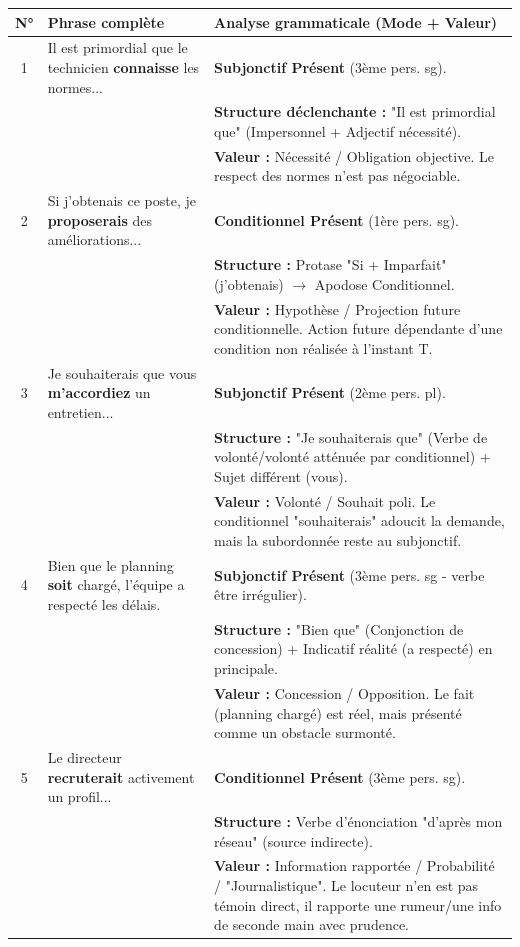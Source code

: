 \documentclass[11pt]{article}
\newcommand{\cle}[1]{{\popxbold\color{popdark}#1}}
\begin{document}
\begin{exoresolu}
\begin{center}
\begin{tabularx}{\linewidth}{|c|l|X|}
\hline
\textbf{N°} & \textbf{Phrase complète} & \textbf{Analyse grammaticale (Mode + Valeur)} \\ \hline
1 & Il est primordial que le technicien \textbf{connaisse} les normes... & \textbf{Subjonctif Présent} (3ème pers. sg). \\
  & & \textbf{Structure déclenchante :} "Il est primordial que" (Impersonnel + Adjectif nécessité). \\
  & & \textbf{Valeur :} \cle{Nécessité / Obligation objective}. Le respect des normes n'est pas négociable. \\ \hline
2 & Si j'obtenais ce poste, je \textbf{proposerais} des améliorations... & \textbf{Conditionnel Présent} (1ère pers. sg). \\
  & & \textbf{Structure :} Protase "Si + Imparfait" (j'obtenais) $\rightarrow$ Apodose Conditionnel. \\
  & & \textbf{Valeur :} \cle{Hypothèse / Projection future conditionnelle}. Action future dépendante d'une condition non réalisée à l'instant T. \\ \hline
3 & Je souhaiterais que vous \textbf{m'accordiez} un entretien... & \textbf{Subjonctif Présent} (2ème pers. pl). \\
  & & \textbf{Structure :} "Je souhaiterais que" (Verbe de volonté/volonté atténuée par conditionnel) + Sujet différent (vous). \\
  & & \textbf{Valeur :} \cle{Volonté / Souhait poli}. Le conditionnel "souhaiterais" adoucit la demande, mais la subordonnée reste au subjonctif. \\ \hline
4 & Bien que le planning \textbf{soit} chargé, l'équipe a respecté les délais. & \textbf{Subjonctif Présent} (3ème pers. sg - verbe être irrégulier). \\
  & & \textbf{Structure :} "Bien que" (Conjonction de concession) + Indicatif réalité (a respecté) en principale. \\
  & & \textbf{Valeur :} \cle{Concession / Opposition}. Le fait (planning chargé) est réel, mais présenté comme un obstacle surmonté. \\ \hline
5 & Le directeur \textbf{recruterait} activement un profil... & \textbf{Conditionnel Présent} (3ème pers. sg). \\
  & & \textbf{Structure :} Verbe d'énonciation "d'après mon réseau" (source indirecte). \\
  & & \textbf{Valeur :} \cle{Information rapportée / Probabilité / "Journalistique"}. Le locuteur n'en est pas témoin direct, il rapporte une rumeur/une info de seconde main avec prudence. \\ \hline

\end{tabularx}
\end{center}
\end{exoresolu}
\end{document}
